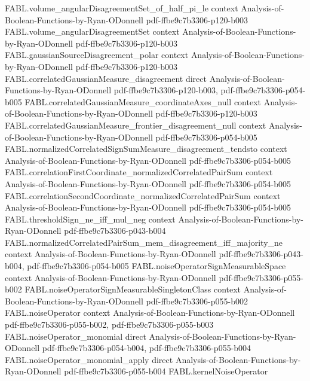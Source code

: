 \begin{theorem}
  {FABL.volume_angularDisagreementSet_of_half_pi_le}
  {context}
  {Analysis-of-Boolean-Functions-by-Ryan-ODonnell}
  {pdf-ffbe9c7b3306-p120-b003}
\proofstep
  {FABL.volume_angularDisagreementSet}
  {context}
  {Analysis-of-Boolean-Functions-by-Ryan-ODonnell}
  {pdf-ffbe9c7b3306-p120-b003}
\proofstep
  {FABL.gaussianSourceDisagreement_polar}
  {context}
  {Analysis-of-Boolean-Functions-by-Ryan-ODonnell}
  {pdf-ffbe9c7b3306-p120-b003}
\proofstep
  {FABL.correlatedGaussianMeasure_disagreement}
  {direct}
  {Analysis-of-Boolean-Functions-by-Ryan-ODonnell}
  {pdf-ffbe9c7b3306-p120-b003,
    pdf-ffbe9c7b3306-p054-b005}
\proofstep
  {FABL.correlatedGaussianMeasure_coordinateAxes_null}
  {context}
  {Analysis-of-Boolean-Functions-by-Ryan-ODonnell}
  {pdf-ffbe9c7b3306-p120-b003}
\proofstep
  {FABL.correlatedGaussianMeasure_frontier_disagreement_null}
  {context}
  {Analysis-of-Boolean-Functions-by-Ryan-ODonnell}
  {pdf-ffbe9c7b3306-p054-b005}
\proofstep
  {FABL.normalizedCorrelatedSignSumMeasure_disagreement_tendsto}
  {context}
  {Analysis-of-Boolean-Functions-by-Ryan-ODonnell}
  {pdf-ffbe9c7b3306-p054-b005}
\proofstep
  {FABL.correlationFirstCoordinate_normalizedCorrelatedPairSum}
  {context}
  {Analysis-of-Boolean-Functions-by-Ryan-ODonnell}
  {pdf-ffbe9c7b3306-p054-b005}
\proofstep
  {FABL.correlationSecondCoordinate_normalizedCorrelatedPairSum}
  {context}
  {Analysis-of-Boolean-Functions-by-Ryan-ODonnell}
  {pdf-ffbe9c7b3306-p054-b005}
\proofstep
  {FABL.thresholdSign_ne_iff_mul_neg}
  {context}
  {Analysis-of-Boolean-Functions-by-Ryan-ODonnell}
  {pdf-ffbe9c7b3306-p043-b004}
\proofstep
  {FABL.normalizedCorrelatedPairSum_mem_disagreement_iff_majority_ne}
  {context}
  {Analysis-of-Boolean-Functions-by-Ryan-ODonnell}
  {pdf-ffbe9c7b3306-p043-b004,
    pdf-ffbe9c7b3306-p054-b005}
\proofstep
  {FABL.noiseOperatorSignMeasurableSpace}
  {context}
  {Analysis-of-Boolean-Functions-by-Ryan-ODonnell}
  {pdf-ffbe9c7b3306-p055-b002}
\proofstep
  {FABL.noiseOperatorSignMeasurableSingletonClass}
  {context}
  {Analysis-of-Boolean-Functions-by-Ryan-ODonnell}
  {pdf-ffbe9c7b3306-p055-b002}
\proofstep
  {FABL.noiseOperator}
  {context}
  {Analysis-of-Boolean-Functions-by-Ryan-ODonnell}
  {pdf-ffbe9c7b3306-p055-b002,
    pdf-ffbe9c7b3306-p055-b003}
\proofstep
  {FABL.noiseOperator_monomial}
  {direct}
  {Analysis-of-Boolean-Functions-by-Ryan-ODonnell}
  {pdf-ffbe9c7b3306-p054-b004,
    pdf-ffbe9c7b3306-p055-b004}
\proofstep
  {FABL.noiseOperator_monomial_apply}
  {direct}
  {Analysis-of-Boolean-Functions-by-Ryan-ODonnell}
  {pdf-ffbe9c7b3306-p055-b004}
\proofstep
  {FABL.kernelNoiseOperator}

\end{theorem}
